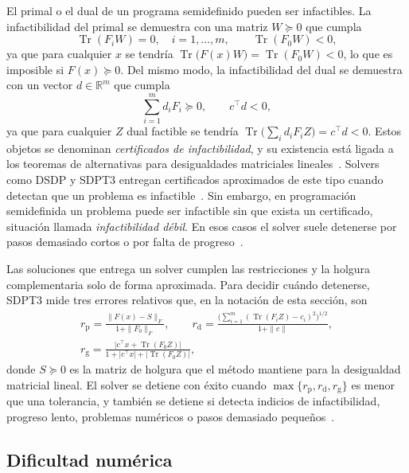 El primal o el dual de un programa semidefinido pueden ser infactibles. La infactibilidad del
primal se demuestra con una matriz $W \succeq 0$ que cumpla
\[
    \operatorname{Tr}(F_i W) = 0, \quad i = 1, \ldots, m, \qquad \operatorname{Tr}(F_0 W) < 0,
\]
ya que para cualquier $x$ se tendría $\operatorname{Tr}\bigl(F(x) W\bigr) = \operatorname{Tr}(F_0
W) < 0$, lo que es imposible si $F(x) \succeq 0$. Del mismo modo, la infactibilidad del dual se
demuestra con un vector $d \in \mathbb{R}^m$ que cumpla
\[
    \sum_{i=1}^{m} d_i F_i \succeq 0, \qquad c^\top d < 0,
\]
ya que para cualquier $Z$ dual factible se tendría
$\operatorname{Tr}\bigl(\sum_i d_i F_i Z\bigr) = c^\top d < 0$. Estos objetos se denominan
\textit{certificados de infactibilidad}, y su existencia está ligada a los teoremas de
alternativas para desigualdades matriciales
lineales~\parencite[pp.~270--271]{boydConvexOptimization2004}. Solvers como DSDP y SDPT3
entregan certificados aproximados de este tipo cuando detectan que un problema es
infactible~\parencites[p.~16:1]{bensonAlgorithm875DSDP5software2008}[sec.~3]{tohImplementationUsageSDPT32012a}.
Sin embargo, en programación semidefinida un problema puede ser infactible sin que exista un
certificado, situación llamada \textit{infactibilidad débil}. En esos casos el solver suele
detenerse por pasos demasiado cortos o por falta de progreso~\parencite[sec.~3]{tohImplementationUsageSDPT32012a}.

Las soluciones que entrega un solver cumplen las restricciones y la holgura complementaria solo
de forma aproximada. Para decidir cuándo detenerse, SDPT3 mide tres errores relativos que, en la
notación de esta sección, son
\begin{gather*}
    r_{\mathrm{p}} = \frac{\| F(x) - S \|_F}{1 + \|F_0\|_F}, \qquad
    r_{\mathrm{d}} = \frac{\bigl(\sum_{i=1}^{m} (\operatorname{Tr}(F_i Z) - c_i)^2\bigr)^{1/2}}{1 + \|c\|}, \\
    r_{\mathrm{g}} = \frac{\bigl|c^\top x + \operatorname{Tr}(F_0 Z)\bigr|}
    {1 + |c^\top x| + |\operatorname{Tr}(F_0 Z)|},
\end{gather*}
donde $S \succeq 0$ es la matriz de holgura que el método mantiene para la desigualdad
matricial lineal. El solver se detiene con éxito cuando $\max\{r_{\mathrm{p}}, r_{\mathrm{d}},
r_{\mathrm{g}}\}$ es menor que una tolerancia, y también se detiene si detecta indicios de
infactibilidad, progreso lento, problemas numéricos o pasos demasiado
pequeños~\parencite[sec.~3.3]{tohImplementationUsageSDPT32012a}.

\subsection{Dificultad numérica}
\label{subsec:sdp_dificultad}


